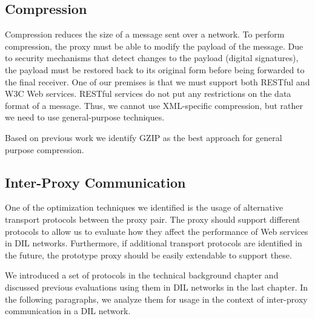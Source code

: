 \subsection{Compression}

Compression reduces the size of a message sent over a network. To perform
compression, the proxy must be able to modify the payload of the message. Due to
security mechanisms that detect changes to the payload (digital signatures), the
payload must be restored back to its original form before being forwarded to the
final receiver. One of our premises is that we must support both RESTful and W3C
Web services. RESTful services do not put any restrictions on the data format of
a message. Thus, we cannot use XML-specific compression, but rather we need to
use general-purpose techniques.

Based on previous work we identify GZIP as the best approach for general
purpose compression.

\subsection{Inter-Proxy Communication}

One of the optimization techniques we identified is the usage of alternative
transport protocols between the proxy pair. The proxy should support different
protocols to allow us to evaluate how they affect the performance of Web
services in DIL networks. Furthermore, if additional transport protocols are
identified in the future, the prototype proxy should be easily extendable to
support these.

We introduced a set of protocols in the technical background chapter and
discussed previous evaluations using them in DIL networks in the last chapter.
In the following paragraphs, we analyze them for usage in the context of
inter-proxy communication in a DIL network.

